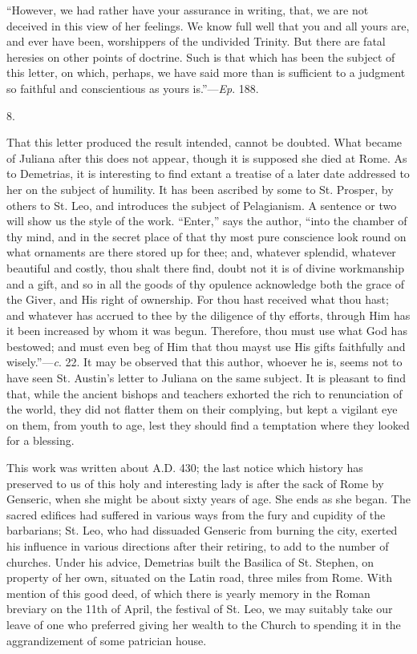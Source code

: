 ``However, we had rather have your assurance in writing, that,
we are not deceived in this view of her feelings. We know full well
that you and all yours are, and ever have been, worshippers of the
undivided Trinity. But there are fatal heresies on other points of
doctrine. Such is that which has been the subject of this letter, on
which, perhaps, we have said more than is sufficient to a judgment so
faithful and conscientious as yours is.''—\emph{Ep}. 188.

8.

That this letter produced the result intended, cannot be doubted.
What became of Juliana after this does not appear, though it is
supposed she died at Rome. As to Demetrias, it is interesting to
find extant a treatise of a later date addressed to her on the subject
of humility. It has been ascribed by some to St. Prosper, by others to
St. Leo, and introduces the subject of Pelagianism. A sentence or two
will show us the style of the work. ``Enter,'' says the
author, ``into the chamber of thy mind, and in the secret place of
that thy most pure conscience look round on what ornaments are there
stored up for thee; and, whatever splendid, whatever beautiful and
costly, thou shalt there find, doubt not it is of divine workmanship
and a gift, and so in all the goods of thy opulence acknowledge both
the grace of the Giver, and His right of ownership. For thou hast
received what thou hast; and whatever has accrued to thee by the
diligence of thy efforts, through Him has it been increased by whom it
was begun. Therefore, thou must use what God has bestowed; and must
even beg of Him that thou mayst use His gifts faithfully and
wisely.''—\emph{c}. 22. It may be observed that this author,
whoever he is, seems not to have seen St. Austin's letter to Juliana
on the same subject. It is pleasant to find that, while the ancient
bishops and teachers exhorted the rich to renunciation of the world,
they did not flatter them on their complying, but kept a vigilant eye
on them, from youth to age, lest they should find a temptation where
they looked for a blessing.

This work was written about A.D. 430; the
last notice which history has preserved to us of this holy and
interesting lady is after the sack of Rome by Genseric, when she might
be about sixty years of age. She ends as she began. The sacred
edifices had suffered in various ways from the fury and cupidity of
the barbarians; St. Leo, who had dissuaded Genseric from burning the
city, exerted his influence in various directions after their
retiring, to add to the number of churches. Under his advice,
Demetrias built the Basilica of St. Stephen, on property of her own,
situated on the Latin road, three miles from Rome. With mention of
this good deed, of which there is yearly memory in the Roman breviary
on the 11th of April, the festival of St. Leo, we may suitably take
our leave of one who preferred giving her wealth to the Church to
spending it in the aggrandizement of some patrician house.

